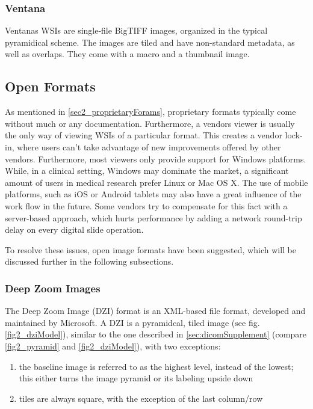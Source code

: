 \subsubsection{Ventana}
Ventanas WSIs are single-file BigTIFF images, organized in the typical pyramidical scheme. The images are tiled and have non-standard metadata, as well as overlaps. They come with a macro and a thumbnail image\cite{web:openslide}.

	
\subsection{Open Formats}
\label{sec2_openFormats}
As mentioned in \ref{sec2_proprietaryForams}, proprietary formats typically come without much or any documentation. Furthermore, a vendors viewer is usually the only way of viewing WSIs of a particular format. This creates a vendor lock-in, where users can't take advantage of new improvements offered by other vendors. Furthermore, most viewers only provide support for Windows platforms. While, in a clinical setting, Windows may dominate the market, a significant amount of users in medical research prefer Linux or Mac OS X\cite{Goode13}. The use of mobile platforms, such as iOS or Android tablets may also have a great influence of the work flow in the future. Some vendors try to compensate for this fact with a server-based approach, which hurts performance by adding a network round-trip delay on every digital slide operation\cite{Goode13}.

To resolve these issues, open image formats have been suggested, which will be discussed further in the following subsections.


\subsubsection{Deep Zoom Images}
The Deep Zoom Image (DZI) format is an XML-based file format, developed and maintained by Microsoft\cite{web:dzi}. A DZI is a pyramidcal, tiled image (see fig. \ref{fig2_dziModel}), similar to the one described in \ref{sec:dicomSupplement} (compare \ref{fig2_pyramid} and \ref{fig2_dziModel}), with two exceptions:
\begin{enumerate}
	\item the baseline image is referred to as the highest level, instead of the lowest; this either turns the image pyramid or its labeling upside down
	\item tiles are always square, with the exception of the last column/row
\end{enumerate}

